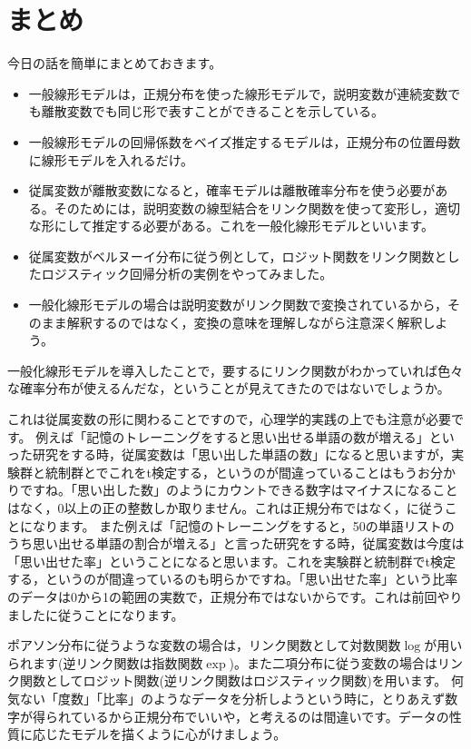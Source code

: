 \documentclass{ltjsbook}
\begin{document}
\section{まとめ}
今日の話を簡単にまとめておきます。
\begin{itemize}
  \item 一般線形モデルは，正規分布を使った線形モデルで，説明変数が連続変数でも離散変数でも同じ形で表すことができることを示している。
  \item 一般線形モデルの回帰係数をベイズ推定するモデルは，正規分布の位置母数に線形モデルを入れるだけ。
  \item 従属変数が離散変数になると，確率モデルは離散確率分布を使う必要がある。そのためには，説明変数の線型結合をリンク関数を使って変形し，適切な形にして推定する必要がある。これを一般化線形モデルといいます。
  \item 従属変数がベルヌーイ分布に従う例として，ロジット関数をリンク関数としたロジスティック回帰分析の実例をやってみました。
  \item 一般化線形モデルの場合は説明変数がリンク関数で変換されているから，そのまま解釈するのではなく，変換の意味を理解しながら注意深く解釈しよう。
\end{itemize}
一般化線形モデルを導入したことで，要するにリンク関数がわかっていれば色々な確率分布が使えるんだな，ということが見えてきたのではないでしょうか。

これは従属変数の形に関わることですので，心理学的実践の上でも注意が必要です。
例えば「記憶のトレーニングをすると思い出せる単語の数が増える」といった研究をする時，従属変数は「思い出した単語の数」になると思いますが，実験群と統制群とでこれをt検定する，というのが間違っていることはもうお分かりですね。「思い出した数」のようにカウントできる数字はマイナスになることはなく，0以上の正の整数しか取りません。これは正規分布ではなく，に従うことになります。
また例えば「記憶のトレーニングをすると，50の単語リストのうち思い出せる単語の割合が増える」と言った研究をする時，従属変数は今度は「思い出せた率」ということになると思います。これを実験群と統制群でt検定する，というのが間違っているのも明らかですね。「思い出せた率」という比率のデータは0から1の範囲の実数で，正規分布ではないからです。これは前回やりましたに従うことになります。

ポアソン分布に従うような変数の場合は，リンク関数として対数関数$\log$が用いられます(逆リンク関数は指数関数$\exp$)。また二項分布に従う変数の場合はリンク関数としてロジット関数(逆リンク関数はロジスティック関数)を用います。
何気ない「度数」「比率」のようなデータを分析しようという時に，とりあえず数字が得られているから正規分布でいいや，と考えるのは間違いです。データの性質に応じたモデルを描くように心がけましょう。
\end{document}
